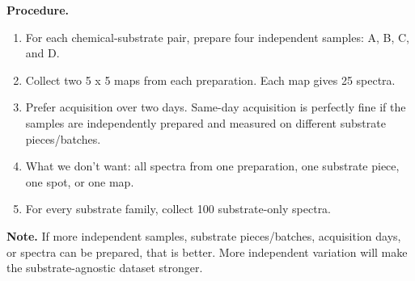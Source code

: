 \documentclass[10pt]{article}
\begin{document}
\textbf{Procedure.}
\begin{enumerate}
  \item For each chemical-substrate pair, prepare four independent samples: A, B, C, and D.
  \item Collect two 5 x 5 maps from each preparation. Each map gives 25 spectra.
  \item Prefer acquisition over two days. Same-day acquisition is perfectly fine if the samples are independently prepared and measured on different substrate pieces/batches.
  \item What we don't want: all spectra from one preparation, one substrate piece, one spot, or one map.
  \item For every substrate family, collect 100 substrate-only spectra.
\end{enumerate}

\textbf{Note.} If more independent samples, substrate pieces/batches, acquisition days, or spectra can be prepared, that is better. More independent variation will make the substrate-agnostic dataset stronger.
\end{document}

